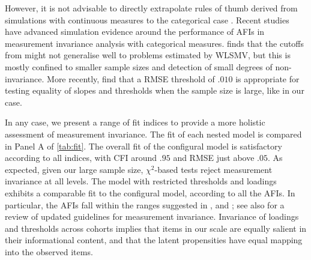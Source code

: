 However, it is not advisable to directly extrapolate rules of thumb derived from simulations with continuous measures to the categorical case \citep{Lubke2004}. Recent studies have advanced simulation evidence around the performance of AFIs in measurement invariance analysis with categorical measures. \citet{Sass2014} finds that the cutoffs from \citet{Chen2007} might not generalise well to problems estimated by WLSMV, but this is mostly confined to smaller sample sizes and detection of small degrees of non-invariance. More recently, \citet{Rutkowski2017} find that a \textDelta RMSE threshold of $.010$ is appropriate for testing equality of slopes and thresholds when the sample size is large, like in our case. 

In any case, we present a range of fit indices to provide a more holistic assessment of measurement invariance. The fit of each nested model is compared in Panel A of \autoref{tab:fit}. The overall fit of the configural model is satisfactory according to all indices, with CFI around $.95$ and RMSE just above $.05$. As expected, given our large sample size, $\chi^2$-based tests reject measurement invariance at all levels. The model with restricted thresholds and loadings exhibits a comparable fit to the configural model, according to all the AFIs. In particular, the \textDelta AFIs fall within the ranges suggested in \citet{Chen2007}, \citet{Rutkowski2017} and \citet{Svetina2017}; see also \citet{Svetina2019} for a review of updated guidelines for measurement invariance. Invariance of loadings and thresholds across cohorts implies that items in our scale are equally salient in their informational content, and that the latent propensities have equal mapping into the observed items. 

